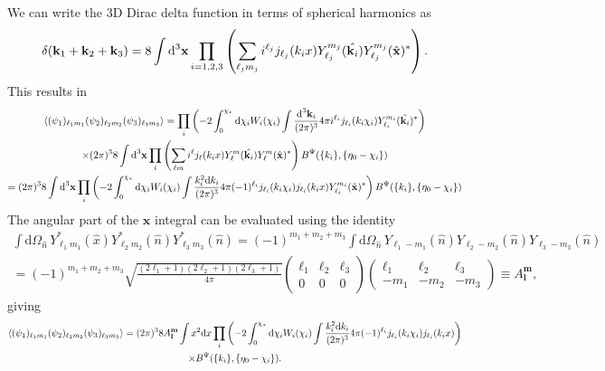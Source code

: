 \documentclass[11pt]{article} %
\DeclareRobustCommand{\d}{\ifmmode\text{d}\else d\fi}
\newcommand{\br}[1]{\ensuremath{\left( #1 \right)}}
\begin{document}
We can write the 3D Dirac delta function in terms of spherical harmonics as
\begin{equation*}
    \delta(\mathbf k_1 + \mathbf k_2 + \mathbf k_3) = 8\int\d^3\mathbf x\prod_{i=1,2,3}\br{ \sum_{\ell_jm_j} i^{\ell_j}j_{\ell_j}(k_ix)Y_{\ell_j}^{m_j}(\hat{\mathbf k_i}) Y_{\ell_j}^{m_j}(\hat{\mathbf x})^* }.
\end{equation*}
This results in
\begin{gather*}
    \langle (\psi_1)_{\ell_1m_1}(\psi_2)_{\ell_2m_2}(\psi_3)_{\ell_3m_3} \rangle= \prod_i\br{-2\int_0^{\chi_*}\d\chi_i W_i(\chi_i)\int\frac{\d^3\mathbf k_i}{(2\pi)^{3}}4\pi i^{\ell_i}j_{\ell_i}(k_i\chi_i)Y_{\ell_i}^{m_i}(\hat{\mathbf k_i})^*} \\
    \times (2\pi)^38\int\d^3\mathbf x\prod_{i}\br{ \sum_{\ell m} i^{\ell}j_{\ell}(k_ix)Y_{\ell}^{m}(\hat{\mathbf k_i}) Y_{\ell}^{m}(\hat{\mathbf x})^* }B^\Psi(\{k_i\}, \{\eta_0-\chi_i\})\\
    = (2\pi)^38\int\d^3\mathbf x\prod_i\br{-2\int_0^{\chi_*}\d\chi_i W_i(\chi_i)\int\frac{k_i^2\d k_i}{(2\pi)^{3}}4\pi (-1)^{\ell_i}j_{\ell_i}(k_i\chi_i)j_{\ell_i}(k_ix) Y_{\ell_i}^{m_i}(\hat{\mathbf x})^*} B^\Psi(\{k_i\}, \{\eta_0-\chi_i\})
\end{gather*}
The angular part of the $\mathbf x$ integral can be evaluated using the identity
\begin{gather*}
    \int \mathrm{d}\Omega_{\hat{n}} \, Y_{\ell_1 m_1}^*(\hat{x}) Y_{\ell_2 m_2}^*(\hat{n}) Y_{\ell_3 m_3}^*(\hat{n}) = (-1)^{m_1 + m_2 + m_3} 
    \int \mathrm{d}\Omega_{\hat{n}} \, Y_{\ell_1 -m_1}(\hat{n}) Y_{\ell_2 -m_2}(\hat{n})Y_{\ell_3 -m_3}(\hat{n}) \\
    = (-1)^{m_1 + m_2 + m_3} 
    \sqrt{\frac{(2\ell_1 + 1)(2\ell_2 + 1)(2\ell_3 + 1)}{4\pi}} \begin{pmatrix} \ell_1 & \ell_2 & \ell_3 \\ 0 & 0 & 0 \end{pmatrix}
    \begin{pmatrix} \ell_1 & \ell_2 & \ell_3 \\ -m_1 & -m_2 & -m_3 \end{pmatrix} \equiv A_{\mathbf{l}}^{\mathbf{m}},
\end{gather*}
giving
\begin{gather*}
    \langle (\psi_1)_{\ell_1m_1}(\psi_2)_{\ell_2m_2}(\psi_3)_{\ell_3m_3} \rangle 
    = (2\pi)^3 8 A_{\mathbf l}^{\mathbf m}\int x^2\d x\prod_i\br{-2\int_0^{\chi_*}\d\chi_i W_i(\chi_i)\int\frac{k_i^2\d k_i}{(2\pi)^{3}}4\pi (-1)^{\ell_i}j_{\ell_i}(k_i\chi_i)j_{\ell_i}(k_ix)} \\ \times B^\Psi(\{k_i\}, \{\eta_0-\chi_i\}).
\end{gather*}
\end{document}

